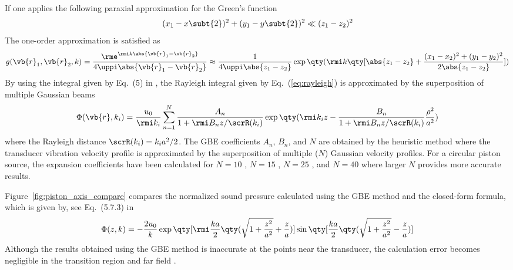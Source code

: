 If one applies the following paraxial approximation for the Green's function 
\begin{equation}
    (x_1-x\subt{2})^2 +(y_1-y\subt{2})^2  \ll (z_1-z_2)^2
\end{equation}
The one-order approximation is satisfied as \cite{Freedman1960SoundFieldRectangular, Mast2007FresnelApproximationsAcoustic}
\begin{equation}
    g(\vb{r}_1,\vb{r}_2,k ) 
    =\frac{\rme^{\rmi k \abs{\vb{r}_1-\vb{r}_2}}}{4\uppi \abs{\vb{r}_1-\vb{r}_2}}
        \approx
        \frac{1}{4\uppi \abs{z_1-z_2}}
        \exp\qty(\rmi k\qty[\abs{z_1-z_2} + \frac{(x_1-x_2)^2 +(y_1-y_2)^2 }{2\abs{z_1-z_2}}])
\end{equation}
By using the integral given by Eq.~(5) in \cite{Ding2003ExtensionsGaussianBeam},  the Rayleigh integral given by Eq.~(\ref{eq:rayleigh}) is approximated by the superposition of multiple Gaussian beams
\begin{equation}
    \Phi(\vb{r}, k_i) = 
    \frac{u_0}{\rmi k_i}
    \sum_{n=1}^N \frac{A_n}{1+\rmi B_nz/\scrR(k_i) }
    \exp\qty( \rmi k_i z - \frac{B_n}{1+\rmi B_nz/\scrR(k_i)} \frac{\rho^2}{a^2})
    \label{eq:piston:gbe}
\end{equation}
where the Rayleigh distance $\scrR(k_i) = k_ia^2/2$.
The GBE coefficients $A_n$, $B_n$, and $N$ are obtained by the heuristic method
where the transducer vibration velocity profile is approximated by the superposition of multiple ($N$) Gaussian velocity profiles. 
For a circular piston source, the expansion coefficients have been calculated for $N = 10$ \cite{Wen1988DiffractionBeamField}, $N = 15$ \cite{Huang1999GaussianFiniteelementMethod}, $N = 25$ \cite{Kim2006GenerationBasisSets}, and $N = 40$ \cite{Cervenka2015StructureMultiGaussianBeam} where larger $N$ provides more accurate results. 

Figure~\ref{fig:piston_axis_compare} compares the normalized sound pressure calculated using the GBE method and the closed-form formula, which is given by,  see Eq.~(5.7.3) in \cite{Pierce2019AcousticsIntroductionIts}
\begin{equation}
    \Phi (z,k)
    =
    -\frac{2u_0}{k}
    \exp\qty[\rmi \frac{ka}{2} \qty(\sqrt{1+\frac{z^2}{a^2}} + \frac{z}{a}) ]
    \sin\qty[\frac{ka}{2}\qty(\sqrt{1+\frac{z^2}{a^2}} -\frac{z}{a})]
    \label{eq:piston:axis:closed_form}
\end{equation}
Although the results obtained using the GBE method is inaccurate at the points near the transducer, 
the calculation error becomes negligible in the transition region and far field \cite{Wen1988DiffractionBeamField}.

